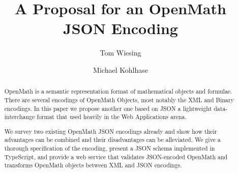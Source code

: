 \documentclass[12pt]{article}
\title{A Proposal for an OpenMath JSON Encoding}
\author{Tom Wiesing\and Michael Kohlhase}
\begin{document}
\maketitle

\begin{abstract}
  OpenMath is a semantic representation format of mathematical objects and formulae.
  There are several encodings of OpenMath Objects, most notably the XML and Binary
  encodings. In this paper we propose another one based on JSON a lightweight
  data-interchange format that used heavily in the Web Applications arena. 
  
  We survey two existing OpenMath JSON encodings already and show how their advantages can
  be combined and their disadvantages can be alleviated. We give a thorough specification
  of the encoding, present a JSON schema implemented in TypeScript, and provide a web
  service that validates JSON-encoded OpenMath and transforms OpenMath objects between XML
  and JSON encodings.
\end{abstract}
    






\printbibliography
\end{document}
